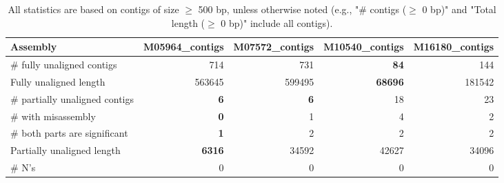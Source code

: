 \documentclass[12pt,a4paper]{article}
\begin{document}
\begin{table}[ht]
\begin{center}
\caption{All statistics are based on contigs of size $\geq$ 500 bp, unless otherwise noted (e.g., "\# contigs ($\geq$ 0 bp)" and "Total length ($\geq$ 0 bp)" include all contigs).}
\begin{tabular}{|l*{4}{|r}|}
\hline
Assembly & M05964\_contigs & M07572\_contigs & M10540\_contigs & M16180\_contigs \\ \hline
\# fully unaligned contigs & 714 & 731 & {\bf 84} & 144 \\ \hline
Fully unaligned length & 563645 & 599495 & {\bf 68696} & 181542 \\ \hline
\# partially unaligned contigs & {\bf 6} & {\bf 6} & 18 & 23 \\ \hline
\hspace{5mm}\# with misassembly & {\bf 0} & 1 & 4 & 2 \\ \hline
\hspace{5mm}\# both parts are significant & {\bf 1} & 2 & 2 & 2 \\ \hline
Partially unaligned length & {\bf 6316} & 34592 & 42627 & 34096 \\ \hline
\# N's & 0 & 0 & 0 & 0 \\ \hline
\end{tabular}
\end{center}
\end{table}
\end{document}
